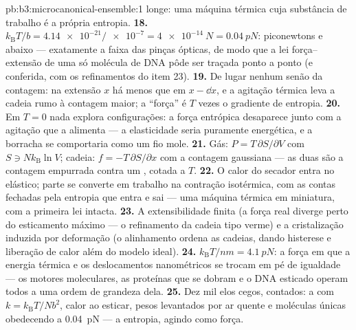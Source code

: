 \begin{solution}{pb:b3:microcanonical-ensemble:1}
longe: uma máquina térmica cuja substância de trabalho é a própria
entropia.
\textbf{18.} $k_{\text{B}}T/b = \num{4.14e-21}/\num{e-7} =
\qty{4e-14}{N} = \qty{0.04}{pN}$: piconewtons e abaixo --- exatamente a
faixa das pinças ópticas, de modo que a lei força--extensão de uma só
molécula de DNA pôde ser traçada ponto a ponto (e conferida, com os
refinamentos do item 23).
\textbf{19.} De lugar nenhum senão da contagem: na extensão $x$ há
menos  que em $x - \dd x$, e a agitação térmica leva a
cadeia rumo à contagem maior; a ``força'' é $T$ vezes o gradiente de
entropia.
\textbf{20.} Em $T = 0$ nada explora configurações: a força entrópica
desaparece junto com a agitação que a alimenta --- a elasticidade seria
puramente energética, e a borracha se comportaria como um fio mole.
\textbf{21.} Gás: $P = T\,\partial S/\partial V$ com $S \ni
Nk_{\text{B}}\ln V$; cadeia: $f = -T\,\partial S/\partial x$ com a
contagem gaussiana --- as duas são a contagem empurrada contra um
, cotada a $T$.
\textbf{22.} O calor do secador entra no elástico; parte se converte em
trabalho na contração isotérmica, com as contas fechadas pela entropia
que entra e sai --- uma máquina térmica em miniatura, com a primeira
lei intacta.
\textbf{23.} A extensibilidade finita (a força real diverge perto do
esticamento máximo --- o refinamento da cadeia tipo verme) e a
cristalização induzida por deformação (o alinhamento ordena as cadeias,
dando histerese e liberação de calor além do modelo ideal).
\textbf{24.} $k_{\text{B}}T/\unit{nm} = \qty{4.1}{pN}$: a força em que
a energia térmica e os deslocamentos nanométricos se trocam em pé de
igualdade --- os motores moleculares, as proteínas que se dobram e o
DNA esticado operam todos a uma ordem de grandeza dela.
\textbf{25.} Dez mil elos cegos, contados: a  com
$k = k_{\text{B}}T/Nb^2$, calor ao esticar, pesos levantados por ar
quente e moléculas únicas obedecendo a \qty{0.04}{pN} --- a entropia,
agindo como força.
\end{solution}
